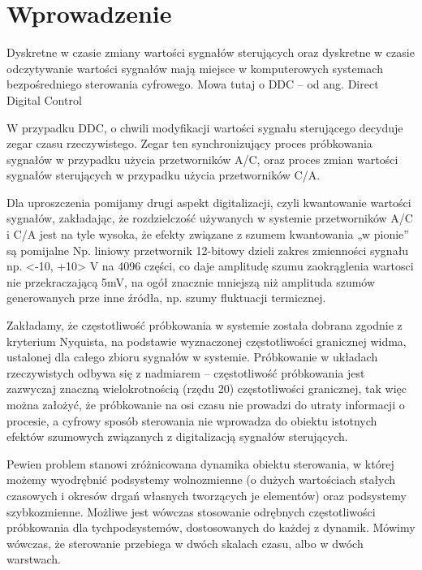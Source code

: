 \documentclass{article}
\begin{document}
	\maketitle
	\section{Wprowadzenie}
		Dyskretne w czasie zmiany wartości sygnałów sterujących oraz dyskretne w czasie
		odczytywanie wartości sygnałów mają miejsce w komputerowych systemach bezpośredniego
		sterowania cyfrowego. Mowa tutaj o DDC – od ang. Direct Digital Control

		W przypadku DDC, o chwili modyfikacji wartości sygnału sterującego 
		decyduje zegar czasu rzeczywistego. Zegar ten synchronizujący proces próbkowania
		sygnałów w przypadku użycia przetworników A/C, oraz proces zmian wartości sygnałów
		sterujących w przypadku użycia przetworników C/A.

		Dla uproszczenia pomijamy drugi aspekt digitalizacji, czyli kwantowanie wartości
		sygnałów, zakładając, że rozdzielczość używanych w systemie przetworników A/C i C/A
		jest na tyle wysoka, że efekty związane z szumem kwantowania „w pionie” są pomijalne
		Np. liniowy przetwornik 12-bitowy dzieli zakres zmienności sygnału np. <-10, +10> V
		na 4096 części, co daje amplitudę szumu zaokrąglenia wartosci nie przekraczającą 5mV,
		na ogół znacznie mniejszą niż amplituda szumów generowanych prze inne źródła, np.
		szumy fluktuacji termicznej.

		Zakładamy, że częstotliwość próbkowania w systemie została dobrana zgodnie z
		kryterium Nyquista, na podstawie wyznaczonej częstotliwości granicznej widma,
		ustalonej dla całego zbioru sygnałów w systemie.
		Próbkowanie w układach rzeczywistych odbywa się z nadmiarem – częstotliwość
		próbkowania jest zazwyczaj znaczną wielokrotnością
		(rzędu 20) częstotliwości
		granicznej, tak więc można założyć, że próbkowanie na osi czasu nie prowadzi do utraty
		informacji o procesie, a cyfrowy sposób sterowania nie wprowadza do obiektu istotnych
		efektów szumowych związanych z digitalizacją sygnałów sterujących.

		Pewien problem stanowi zróżnicowana dynamika obiektu sterowania, w której możemy
		wyodrębnić podsystemy wolnozmienne (o dużych wartościach stałych czasowych i
		okresów drgań własnych tworzących je elementów) oraz podsystemy szybkozmienne.
		Możliwe jest wówczas stosowanie odrębnych częstotliwości próbkowania dla tychpodsystemów,
		dostosowanych do każdej z dynamik. Mówimy wówczas, że sterowanie
		przebiega w dwóch skalach czasu, albo w dwóch warstwach.
		
\end{document}
